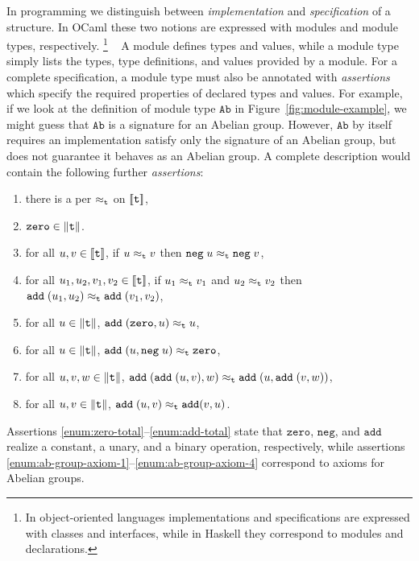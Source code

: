 In programming we distinguish between \emph{implementation} and
\emph{specification} of a structure. In OCaml these two notions are
expressed with modules and module types, respectively.%
\iflong
\footnote{In
  object-oriented languages implementations and specifications are
  expressed with classes and interfaces, while in Haskell they
  correspond to modules and declarations.}
\else %
\ 
\fi %
A module defines types and
values, while a module type simply lists the types, type definitions,
and values provided by a module. For a complete specification, a
module type must also be annotated with \emph{assertions} which
specify the required properties of declared types and values.
\iflong
%
For example, if we look at the definition of module type $\mathtt{Ab}$
in Figure~\ref{fig:module-example}, we might guess 
that $\mathtt{Ab}$ is a signature for an Abelian group. 
%
However, $\mathtt{Ab}$ by itself requires an implementation satisfy
only the signature of an Abelian
group, but does not guarantee it behaves as an Abelian group.
A complete description would contain the
following further \emph{assertions}:
%
\begin{enumerate}
\item
  \label{enum:t-per}%
  there is a per $\approx_{\mathtt{t}}$ on $[\![\mathtt{t}]\!]$,
\item
  \label{enum:zero-total}%
  $\mathtt{zero} \in \|\mathtt{t}\|$.
\item
  \label{enum:neg-total}%
  for all $u, v \in [\![\mathtt{t}]\!]$, if $u \approx_{\mathtt{t}} v$ then
  $\mathtt{neg} \; u \approx_{\mathtt{t}} \mathtt{neg} \; v$,
\item
  \label{enum:add-total}%
  for all $u_1, u_2, v_1, v_2 \in [\![\mathtt{t}]\!]$, if $u_1
  \approx_{\mathtt{t}} v_1$ and $u_2 \approx_{\mathtt{t}} v_2$ then $\mathtt{add} \; (u_1,
  u_2) \approx_{\mathtt{t}} \mathtt{add} \; (v_1, v_2)$,
\item 
  \label{enum:ab-group-axiom-1}%
  for all $u \in \|\mathtt{t}\|$, $\mathtt{add} \;
  (\mathtt{zero}, u) \approx_{\mathtt{t}} u$,
\item
  \label{enum:ab-group-axiom-2}%
  for all $u \in \|\mathtt{t}\|$, $\mathtt{add} \; (u,
  \mathtt{neg} \; u) \approx_{\mathtt{t}} \mathtt{zero}$,
\item
  \label{enum:ab-group-axiom-3}%
  for all $u, v, w \in \|\mathtt{t}\|$, $\mathtt{add} \;
  (\mathtt{add} \; (u, v), w) \approx_{\mathtt{t}} \mathtt{add} \; (u,
  \mathtt{add} \; (v, w))$,
\item
  \label{enum:ab-group-axiom-4}%
  for all $u, v \in \|\mathtt{t}\|$, $\mathtt{add} \; (u, v)
  \approx_{\mathtt{t}} \mathtt{add} (v, u)$.
\end{enumerate}
%
Assertions \ref{enum:zero-total}--\ref{enum:add-total} state that
$\mathtt{zero}$, $\mathtt{neg}$, and $\mathtt{add}$ realize a
constant, a unary, and a binary operation, respectively, while
assertions \ref{enum:ab-group-axiom-1}--\ref{enum:ab-group-axiom-4}
correspond to axioms for Abelian groups. 

